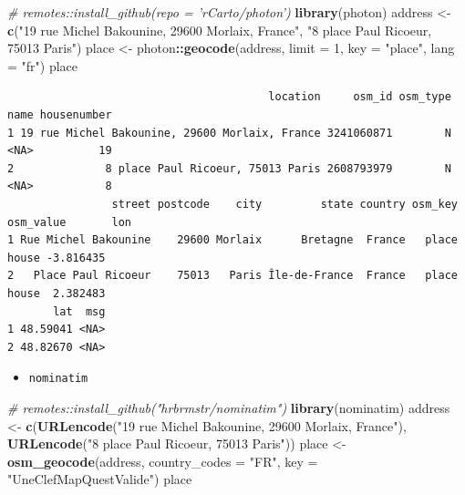 \documentclass[]{book}
\newenvironment{Shaded}{\begin{snugshade}}{\end{snugshade}}
\newcommand{\KeywordTok}[1]{\textcolor[rgb]{0.13,0.29,0.53}{\textbf{#1}}}
\newcommand{\DataTypeTok}[1]{\textcolor[rgb]{0.13,0.29,0.53}{#1}}
\newcommand{\DecValTok}[1]{\textcolor[rgb]{0.00,0.00,0.81}{#1}}
\newcommand{\StringTok}[1]{\textcolor[rgb]{0.31,0.60,0.02}{#1}}
\newcommand{\CommentTok}[1]{\textcolor[rgb]{0.56,0.35,0.01}{\textit{#1}}}
\newcommand{\OperatorTok}[1]{\textcolor[rgb]{0.81,0.36,0.00}{\textbf{#1}}}
\newcommand{\NormalTok}[1]{#1}
\providecommand{\tightlist}{%
  \setlength{\itemsep}{0pt}\setlength{\parskip}{0pt}}
\begin{document}
\begin{Shaded}
\begin{Highlighting}[]
\CommentTok{# remotes::install_github(repo = 'rCarto/photon')  }
\KeywordTok{library}\NormalTok{(photon)}
\NormalTok{address <-}\StringTok{ }\KeywordTok{c}\NormalTok{(}\StringTok{"19 rue Michel Bakounine, 29600 Morlaix, France"}\NormalTok{,}
             \StringTok{"8 place Paul Ricoeur, 75013 Paris"}\NormalTok{)}
\NormalTok{place <-}\StringTok{ }\NormalTok{photon}\OperatorTok{::}\KeywordTok{geocode}\NormalTok{(address, }\DataTypeTok{limit =} \DecValTok{1}\NormalTok{, }\DataTypeTok{key =} \StringTok{"place"}\NormalTok{, }\DataTypeTok{lang =} \StringTok{"fr"}\NormalTok{)}
\NormalTok{place}
\end{Highlighting}
\end{Shaded}

\begin{verbatim}
                                        location     osm_id osm_type name housenumber
1 19 rue Michel Bakounine, 29600 Morlaix, France 3241060871        N <NA>          19
2              8 place Paul Ricoeur, 75013 Paris 2608793979        N <NA>           8
                street postcode    city         state country osm_key osm_value       lon
1 Rue Michel Bakounine    29600 Morlaix      Bretagne  France   place     house -3.816435
2   Place Paul Ricoeur    75013   Paris Île-de-France  France   place     house  2.382483
       lat  msg
1 48.59041 <NA>
2 48.82670 <NA>
\end{verbatim}

\begin{itemize}
\tightlist
\item
  \texttt{nominatim} \citep{R-nominatim}
\end{itemize}

\begin{Shaded}
\begin{Highlighting}[]
\CommentTok{# remotes::install_github("hrbrmstr/nominatim")}
\KeywordTok{library}\NormalTok{(nominatim)}
\NormalTok{address <-}\StringTok{ }\KeywordTok{c}\NormalTok{(}\KeywordTok{URLencode}\NormalTok{(}\StringTok{"19 rue Michel Bakounine, 29600 Morlaix, France"}\NormalTok{),}
             \KeywordTok{URLencode}\NormalTok{(}\StringTok{"8 place Paul Ricoeur, 75013 Paris"}\NormalTok{))}
\NormalTok{place <-}\StringTok{ }\KeywordTok{osm_geocode}\NormalTok{(address, }
                     \DataTypeTok{country_codes =} \StringTok{"FR"}\NormalTok{, }
                     \DataTypeTok{key =} \StringTok{"UneClefMapQuestValide"}\NormalTok{)}
\NormalTok{place}
\end{Highlighting}
\end{Shaded}
\end{document}
